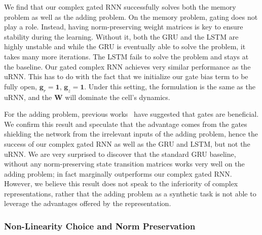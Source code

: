 \documentclass{article}
\begin{document}
We find that our complex gated RNN successfully solves both the memory problem as well as the adding problem.  On the memory problem, gating does not play a role. Instead, having norm-preserving weight matrices is key to ensure stability during the learning.  Without it, both the GRU and the LSTM are highly unstable and while the GRU is eventually able to solve the problem, it takes many more iterations.  The LSTM fails to solve the problem and stays at the baseline.  Our gated complex RNN achieves very similar performance as the uRNN.  This has to do with the fact that we initialize our gate bias term to be fully open, \ie $\mathbf{g}_r = \mathbf{1}$, $\mathbf{g}_z = \mathbf{1}$.  Under this setting, the formulation is the same as the uRNN, and the $\bm{W}$ will dominate the cell's dynamics.  

For the adding problem, previous works~\cite{Arjovsky,Hyland,Wisdom} have suggested that gates are beneficial.  We confirm this result and speculate that the advantage comes from the gates shielding the network from the irrelevant inputs of the adding problem, hence the success of our complex gated RNN as well as the GRU and LSTM, but not the uRNN.  We are very surprised to discover that the standard GRU baseline, without any norm-preserving state transition matrices works very well on the adding problem; in fact marginally outperforms our complex gated RNN.  However, we believe this result does not speak to the inferiority of complex representations, rather that the adding problem as a synthetic task is not able to leverage the advantages offered by the representation.  

\subsubsection{Non-Linearity Choice and Norm Preservation}
\end{document}
